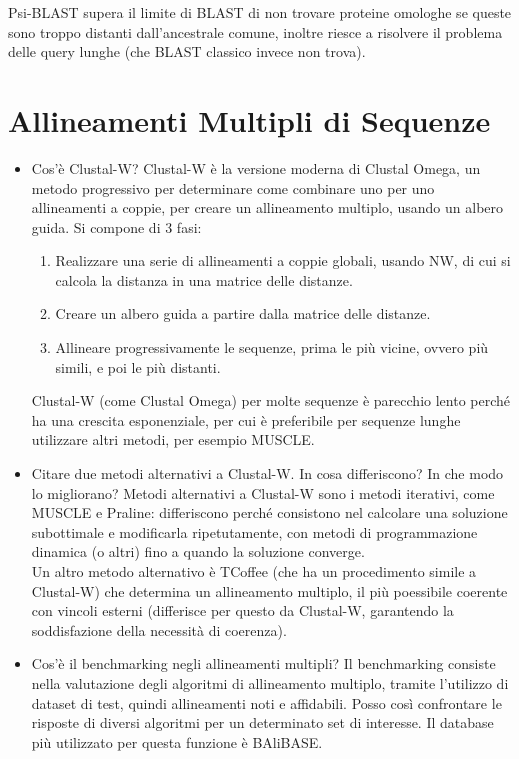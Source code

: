 \documentclass{article}
\begin{document}
\begin{itemize}
      Psi-BLAST supera il limite di BLAST di non trovare proteine omologhe se queste sono troppo distanti dall'ancestrale comune, inoltre riesce a risolvere il problema delle query lunghe (che BLAST classico invece non trova).
\end{itemize}
\section{Allineamenti Multipli di Sequenze}
\begin{itemize}
   \item Cos'è Clustal-W?
      \subitem{-} Clustal-W è la versione moderna di Clustal Omega, un metodo progressivo per determinare come combinare uno per uno allineamenti a coppie, per creare un allineamento multiplo, usando un albero guida. Si compone di 3 fasi:
      \begin{enumerate}
         \item Realizzare una serie di allineamenti a coppie globali, usando NW, di cui si calcola la distanza in una matrice delle distanze.
         \item Creare un albero guida a partire dalla matrice delle distanze.
         \item Allineare progressivamente le sequenze, prima le più vicine, ovvero più simili, e poi le più distanti.
      \end{enumerate}
      Clustal-W (come Clustal Omega) per molte sequenze è parecchio lento perché ha una crescita esponenziale, per cui è preferibile per sequenze lunghe utilizzare altri metodi, per esempio MUSCLE.
   \item Citare due metodi alternativi a Clustal-W. In cosa differiscono? In che modo lo migliorano?
      \subitem{-} Metodi alternativi a Clustal-W sono i metodi iterativi, come MUSCLE e Praline: differiscono perché consistono nel calcolare una soluzione subottimale e modificarla ripetutamente, con metodi di programmazione dinamica (o altri) fino a quando la soluzione converge.\\
      Un altro metodo alternativo è TCoffee (che ha un procedimento simile a Clustal-W) che determina un allineamento multiplo, il più poessibile coerente con vincoli esterni (differisce per questo da Clustal-W, garantendo la soddisfazione della necessità di coerenza).
   \item Cos'è il benchmarking negli allineamenti multipli?
      \subitem{-} Il benchmarking consiste nella valutazione degli algoritmi di allineamento multiplo, tramite l'utilizzo di dataset di test, quindi allineamenti noti e affidabili. Posso così confrontare le risposte di diversi algoritmi per un determinato set di interesse. Il database più utilizzato per questa funzione è BAliBASE.
\end{itemize}
\end{document}
